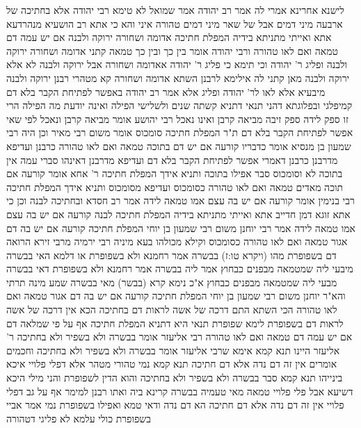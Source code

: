\documentclass[12pt, openany]{book}
\begin{document}
{לישנא אחרינא אמרי לה אמר רב יהודה אמר שמואל  לא טימא רבי יהודה אלא בחתיכה של ארבעה מיני דמים אבל של שאר מיני דמים טהורה 
איני והא כי אתא רב הושעיא מנהרדעא אתא ואייתי מתניתא בידיה  המפלת חתיכה אדומה ושחורה ירוקה ולבנה אם יש עמה דם טמאה ואם לאו טהורה  ורבי יהודה אומר  בין כך ובין כך טמאה 
קתני אדומה ושחורה ירוקה ולבנה ופליג ר' יהודה 
וכי תימא  כי פליג ר' יהודה אאדומה ושחורה אבל ירוקה ולבנה לא אלא ירוקה ולבנה מאן קתני לה 
אילימא לרבנן השתא אדומה ושחורה קא מטהרי רבנן ירוקה ולבנה מיבעיא  אלא לאו לר' יהודה ופליג
אלא אמר רב יהודה  באפשר לפתיחת הקבר בלא דם קמיפלגי ובפלוגתא דהני תנאי דתניא  קשתה שנים ולשלישי הפילה ואינה יודעת מה הפילה הרי זו ספק לידה ספק זיבה מביאה קרבן ואינו נאכל 
רבי יהושע אומר  מביאה קרבן ונאכל לפי שאי אפשר לפתיחת הקבר בלא דם 
ת"ר  המפלת חתיכה סומכוס אומר משום רבי מאיר וכן היה רבי שמעון בן מנסיא אומר כדבריו  קורעה אם יש דם בתוכה טמאה ואם לאו טהורה 
כרבנן ועדיפא מדרבנן כרבנן דאמרי אפשר לפתיחת הקבר בלא דם ועדיפא מדרבנן דאינהו סברי עמה אין בתוכה לא וסומכוס סבר  אפילו בתוכה 
ותניא אידך המפלת חתיכה ר' אחא אומר  קורעה אם תוכה מאדים טמאה ואם לאו טהורה 
כסומכוס ועדיפא מסומכוס 
ותניא אידך המפלת חתיכה רבי בנימין אומר  קורעה אם יש בה עצם אמו טמאה לידה  אמר רב חסדא  ובחתיכה לבנה  וכן כי אתא זוגא דמן חדייב אתא ואייתי מתניתא בידיה  המפלת חתיכה לבנה קורעה אם יש בה עצם אמו טמאה לידה 
אמר רבי יוחנן משום רבי שמעון בן יוחי  המפלת חתיכה קורעה אם יש בה דם אגור טמאה ואם לאו טהורה  כסומכוס וקילא מכולהו 
בעא מיניה רבי ירמיה מרבי זירא  הרואה דם בשפופרת מהו  (ויקרא טו:ז) בבשרה אמר רחמנא ולא בשפופרת או דלמא האי בבשרה מיבעי ליה שמטמאה מבפנים כבחוץ 
אמר ליה  בבשרה אמר רחמנא ולא בשפופרת  דאי בבשרה מבעי ליה שמטמאה מבפנים כבחוץ א"כ נימא קרא (בבשר) מאי בבשרה שמע מינה תרתי 
והא"ר יוחנן משום רבי שמעון בן יוחי  המפלת חתיכה קורעה אם יש בה דם אגור טמאה ואם לאו טהורה 
הכי השתא  התם דרכה של אשה לראות דם בחתיכה הכא אין דרכה של אשה לראות דם בשפופרת 
לימא שפופרת תנאי היא  דתניא  המפלת חתיכה אף על פי שמלאה דם אם יש עמה דם טמאה ואם לאו טהורה  רבי אליעזר אומר  בבשרה ולא בשפיר ולא בחתיכה 
ר' אליעזר היינו תנא קמא  אימא  שרבי אליעזר אומר בבשרה ולא בשפיר ולא בחתיכה
וחכמים אומרים  אין זה דם נדה אלא דם חתיכה  תנא קמא נמי טהורי מטהר  אלא דפלי פלויי איכא בינייהו
תנא קמא סבר  בבשרה ולא בשפיר ולא בחתיכה והוא הדין לשפופרת  והני מילי היכא דשיעא אבל פלי פלויי טמאה מאי טעמיה בבשרה קרינא ביה 
ואתו רבנן למימר  אף על גב דפלי פלויי אין זה דם נדה אלא דם חתיכה הא דם נדה ודאי טמא ואפילו בשפופרת נמי 
אמר אביי  בשפופרת כולי עלמא לא פליגי דטהורה}
\end{document}
